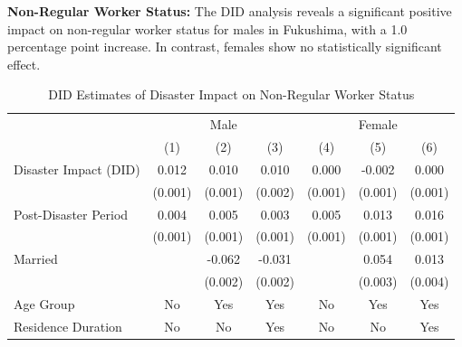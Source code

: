 \documentclass[serif, aspectratio=169]{beamer}
\begin{document}
\begin{frame}[label=nonregular_status]

\textbf{Non-Regular Worker Status:} The DID analysis reveals a significant positive impact on non-regular worker status for males in Fukushima, with a 1.0 percentage point increase. In contrast, females show no statistically significant effect.

\begin{table}[htbp]
\centering
\caption{DID Estimates of Disaster Impact on Non-Regular Worker Status}

\vspace{-0.2cm}


\begin{tabular}{@{}l*{6}{c}@{}}
          &\multicolumn{3}{c}{Male}                                &\multicolumn{3}{c}{Female}                              \\\cmidrule(lr){2-4}\cmidrule(lr){5-7}
          &\multicolumn{1}{c}{(1)}         &\multicolumn{1}{c}{(2)}         &\multicolumn{1}{c}{(3)}         &\multicolumn{1}{c}{(4)}         &\multicolumn{1}{c}{(5)}         &\multicolumn{1}{c}{(6)}         \\
\toprule
Disaster Impact (DID)&    0.012\sym{***}&    0.010\sym{***}&    0.010\sym{***}&    0.000         &   -0.002\sym{**} &    0.000         \\
          &  (0.001)         &  (0.001)         &  (0.002)         &  (0.001)         &  (0.001)         &  (0.001)         \\
\addlinespace
Post-Disaster Period&    0.004\sym{**} &    0.005\sym{***}&    0.003\sym{**} &    0.005\sym{***}&    0.013\sym{***}&    0.016\sym{***}\\
          &  (0.001)         &  (0.001)         &  (0.001)         &  (0.001)         &  (0.001)         &  (0.001)         \\
\addlinespace
Married   &                  &   -0.062\sym{***}&   -0.031\sym{***}&                  &    0.054\sym{***}&    0.013\sym{***}\\
          &                  &  (0.002)         &  (0.002)         &                  &  (0.003)         &  (0.004)         \\
\midrule
Age Group &       No         &      Yes         &      Yes         &       No         &      Yes         &      Yes         \\
Residence Duration&       No         &       No         &      Yes         &       No         &       No         &      Yes         \\

\end{tabular}
\end{table}
\end{frame}
\end{document}
